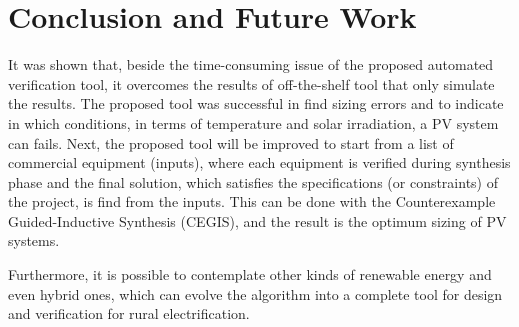 \documentclass[journal]{IEEEtran}
\begin{document}
\section{Conclusion and Future Work}
\label{sec:Conclusions}
%
It was shown that, beside the time-consuming issue of the proposed automated verification tool, it overcomes the results of off-the-shelf tool that only simulate the results. The proposed tool was successful in find sizing errors and to indicate in which conditions, in terms of temperature and solar irradiation, a PV system can fails.
Next, the proposed tool will be improved to start from a list of commercial equipment (inputs), where each equipment is verified during synthesis phase and the final solution, which satisfies the specifications (or constraints) of the project, is find from the inputs. This can be done with the Counterexample Guided-Inductive Synthesis (CEGIS), and the result is the optimum sizing of PV systems.

Furthermore, it is possible to contemplate other kinds of renewable energy and even hybrid ones, which can evolve the algorithm into a complete tool for design and verification for rural electrification.

\end{document}
